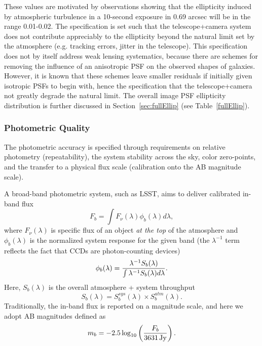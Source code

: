 These values are motivated by observations showing that the
ellipticity induced by atmospheric turbulence in a 10-second exposure
in 0.69 arcsec will be in the range 0.01-0.02.  The specification is
set such that the telescope+camera system does not contribute
appreciably to the
ellipticity beyond the natural limit set by the atmosphere (e.g. tracking
errors, jitter in the telescope).  This
specification does not by itself address weak lensing systematics,
because there are schemes for removing the influence of an anisotropic
PSF on the observed shapes of galaxies.  However, it is known that
these schemes leave smaller residuals if initially given isotropic
PSFs to begin with, hence the specification that the telescope+camera
not greatly degrade the natural limit. The overall image PSF ellipticity distribution
is further discussed in Section~\ref{sec:fullEllip} (see Table~\ref{fullEllip}).




\subsubsection{Photometric Quality}
\label{photoacc}
The photometric accuracy is
specified through requirements on relative photometry (repeatability), the
system stability across the sky, color zero-points, and the transfer to a
physical flux scale (\ie calibration onto the AB magnitude scale).

A broad-band photometric system, such as LSST, aims to
deliver calibrated in-band flux
\begin{equation}
\label{Fb}
             F_b = \int{F_\nu(\lambda) \phi_b(\lambda) d\lambda},
\end{equation}
where $F_\nu(\lambda)$ is specific flux of an object {\it at the top} of
the atmosphere and $\phi_b(\lambda)$ is the normalized system response
for the given band (the $\lambda^{-1}$  term reflects the fact that CCDs
are photon-counting devices)
\begin{equation}
\label{PhiDef}
\phi_b(\lambda) = {\lambda^{-1} S_b(\lambda) \over \int{\lambda^{-1} S_b(\lambda) d\lambda}}.
\end{equation}
Here, $S_b(\lambda)$ is the overall atmosphere + system throughput
\begin{equation}
\label{SDef}
         S_b(\lambda) = S_b^{sys}(\lambda) \times S_b^{atm}(\lambda).
\end{equation}
Traditionally, the in-band flux is reported on a magnitude scale,
and here we adopt AB magnitudes defined as
\begin{equation}
\label{ABmag}
             m_b = -2.5\log_{10}\left({F_b \over 3631 \, {\rm Jy}}\right).
\end{equation}

